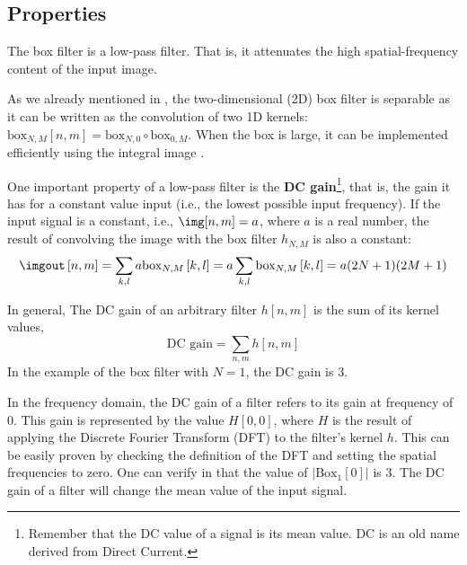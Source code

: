 \subsection{Properties}

The box filter is a low-pass filter. That is, it attenuates the high spatial-frequency content of the input image.

As we already mentioned in \sect{\ref{sec:box_function}}, the two-dimensional (2D) box filter is separable as it can be written as the convolution of two 1D kernels: $\text{box}_{N,M} \left[n,m \right]  = \text{box}_{N,0} \circ \text{box}_{0,M}$. When the box is large, it can be implemented efficiently using the integral image \cite{Viola01}.


One important property of a low-pass filter is the {\bf DC gain}\footnote{Remember that the DC value of a signal is its mean value. DC is an old name derived from Direct Current.}, that is, the gain it has for a constant value input (i.e., the lowest possible input frequency). If the input signal is a constant, i.e., $\img[n,m] = a$, where $a$ is a real number, the result of convolving the image with the box filter $h_{N,M}$ is also a constant:
\begin{equation}
	\imgout \left[n,m\right] = \sum_{k,l} a \text{box}_{N,M} \left[k,l \right] = a \sum_{k,l} \text{box}_{N,M} \left[k,l \right]  = a (2N+1)(2M+1)
\end{equation}

In general, The DC gain of an arbitrary filter $h [n,m]$ is the sum of  its kernel values,
\begin{equation}
	\text{DC~gain} = \sum_{n,m} h [n,m]
\end{equation}
In the example of the box filter with $N=1$, the DC gain is 3.

In the frequency domain, the DC gain of a filter refers to its gain at frequency of 0. This gain is represented by the value $H[0,0]$, where $H$ is the result of applying the Discrete Fourier Transform (DFT) to the filter's kernel $h$. This can be easily proven by checking the definition of the DFT and setting the spatial frequencies to zero. One can verify in \fig{\ref{fig:boxfilter}} that the value of $\left| \text{Box}_1[0] \right|$ is $3$. The DC gain of a filter will change the mean value of the input signal.




